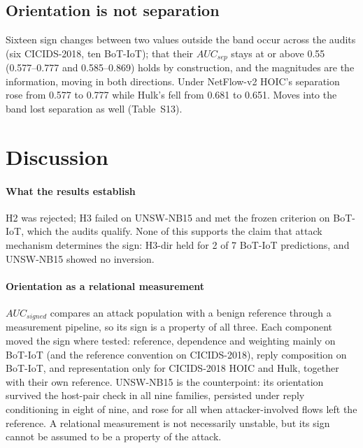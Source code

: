 \documentclass[preprint,12pt]{elsarticle}
\begin{document}
\subsection{Orientation is not separation}\label{sec:sep}

Sixteen sign changes between two values outside the band occur across the audits (six CICIDS-2018, ten BoT-IoT); that their $AUC_{sep}$ stays at or above 0.55 (0.577--0.777 and 0.585--0.869) holds by construction, and the magnitudes are the information, moving in both directions. Under NetFlow-v2 HOIC's separation rose from 0.577 to 0.777 while Hulk's fell from 0.681 to 0.651. Moves into the band lost separation as well (Table~S13).

\section{Discussion}\label{sec:discussion}

\paragraph{What the results establish} H2 was rejected; H3 failed on UNSW-NB15 and met the frozen criterion on BoT-IoT, which the audits qualify. None of this supports the claim that attack mechanism determines the sign: H3-dir held for 2 of 7 BoT-IoT predictions, and UNSW-NB15 showed no inversion.

\paragraph{Orientation as a relational measurement} $AUC_{signed}$ compares an attack population with a benign reference through a measurement pipeline, so its sign is a property of all three. Each component moved the sign where tested: reference, dependence and weighting mainly on BoT-IoT (and the reference convention on CICIDS-2018), reply composition on BoT-IoT, and representation only for CICIDS-2018 HOIC and Hulk, together with their own reference. UNSW-NB15 is the counterpoint: its orientation survived the host-pair check in all nine families, persisted under reply conditioning in eight of nine, and rose for all when attacker-involved flows left the reference. A relational measurement is not necessarily unstable, but its sign cannot be assumed to be a property of the attack.
\end{document}
